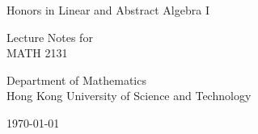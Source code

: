 \begin{titlepage}
  \centering \sffamily
  \vspace*{\fill}

  {\huge\color{ustblue} Honors in Linear and Abstract Algebra I\par}
  \vspace{2cm}

  {Lecture Notes for\\MATH 2131\par}
  \vspace{2cm}

  {Department of Mathematics\\Hong Kong University of Science and Technology\par}
  \vspace{5cm}

  {\today \par}

  \vspace*{\fill}
\end{titlepage}